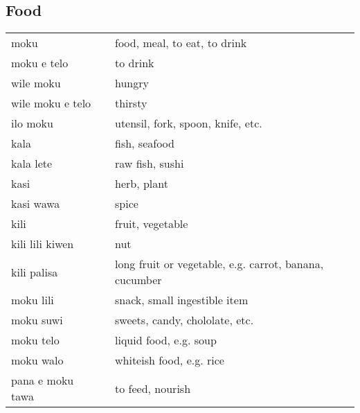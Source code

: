 \subsection{Food}

\begin{supertabular}{p{4,5cm}|ll}
    moku                            &  & food, meal, to eat, to drink                           \\
    moku e telo                     &  & to drink                                               \\
    wile moku                       &  & hungry                                                 \\
    wile moku e telo                &  & thirsty                                                \\
    ilo moku                        &  & utensil, fork, spoon, knife, etc.                      \\
    kala                            &  & fish, seafood                                          \\
    kala lete                       &  & raw fish, sushi                                        \\
    kasi                            &  & herb, plant                                            \\
    kasi wawa                       &  & spice                                                  \\
    kili                            &  & fruit, vegetable                                       \\
    kili lili kiwen                 &  & nut                                                    \\
    kili palisa                     &  & long fruit or vegetable, e.g. carrot, banana, cucumber \\
    moku lili                       &  & snack, small ingestible item                           \\
    moku suwi                       &  & sweets, candy, chololate, etc.                         \\
    moku telo                       &  & liquid food, e.g. soup                                 \\
    moku walo                       &  & whiteish food, e.g. rice                               \\
    pana e moku tawa                &  & to feed, nourish                                       \\

\end{supertabular}
